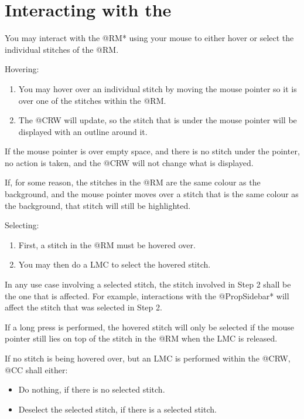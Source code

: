 \documentclass[main.tex]{subfiles}
\begin{document}
\section{Interacting with the }\label{sec:interactrm}

You may interact with the @RM* using your mouse to either hover or select the individual stitches of the @RM.

Hovering:
\begin{enumerate}
\item You may hover over an individual stitch by moving the mouse pointer so it is over one of the stitches within the @RM.
\item The @CRW will update, so the stitch that is under the mouse pointer will be displayed with an outline around it.
\end{enumerate}

If the mouse pointer is over empty space, and there is no stitch under the pointer, no action is taken, and the @CRW will not change what is displayed.

If, for some reason, the stitches in the @RM are the same colour as the background, and the mouse pointer moves over a stitch that is the same colour as the background, that stitch will still be highlighted.

Selecting:
\begin{enumerate}
\item First, a stitch in the @RM must be hovered over. 
\item You may then do a LMC to select the hovered stitch. 
\end{enumerate}

In any use case involving a selected stitch, the stitch involved in Step 2 shall be the one that is affected. For example, interactions with the @PropSidebar* will affect the stitch that was selected in Step 2.

If a long press is performed, the hovered stitch will only be selected if the mouse pointer still lies on top of the stitch in the @RM when the LMC is released.

If no stitch is being hovered over, but an LMC is performed within the @CRW, @CC shall either:
\begin{itemize}
\item Do nothing, if there is no selected stitch.
\item Deselect the selected stitch, if there is a selected stitch.
\end{itemize}
\end{document}
